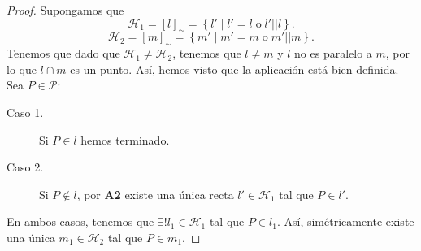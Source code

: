 \begin{proof}
Supongamos que 
\[\mathcal{H}_{1} = \left[l\right] _{\sim} = \left\{ l' \; | \; l' = l \; \text{o} \; l' | | l\right\}  .\]
\[\mathcal{H}_{2} = \left[m\right] _{\sim} = \left\{ m' \; | \; m' = m \; \text{o} \; m' | | m\right\} .\]
Tenemos que dado que $\displaystyle \mathcal{H}_{1} \neq \mathcal{H}_{2} $, tenemos que $\displaystyle l \neq m $ y $\displaystyle l $ no es paralelo a $\displaystyle m $, por lo que $\displaystyle l \cap m $ es un punto. Así, hemos visto que la aplicación está bien definida.\\
Sea $\displaystyle P \in \mathcal{P} $:
\begin{description}
\item[Caso 1.] Si $\displaystyle P \in l $ hemos terminado.
\item[Caso 2.] Si $\displaystyle P \not\in l $, por \textbf{A2} existe una única recta $\displaystyle l' \in \mathcal{H}_{1} $ tal que $\displaystyle P \in l' $.
\end{description}
En ambos casos, tenemos que $\displaystyle \exists! l_{1} \in \mathcal{H}_{1} $ tal que $\displaystyle P \in l_{1} $. Así, simétricamente existe una única $\displaystyle m_{1} \in \mathcal{H}_{2} $ tal que $\displaystyle P \in m_{1} $. 
\end{proof}
